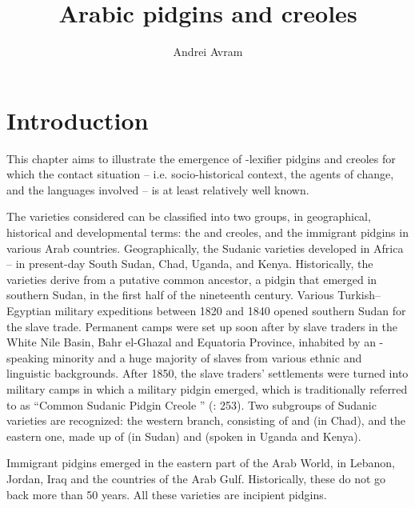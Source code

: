 \documentclass[output=paper]{langsci/langscibook}
\author{Andrei Avram\affiliation{University of Bucharest}}
\title{Arabic pidgins and creoles}
\begin{document}
\maketitle 


\section{Introduction}

This chapter aims to illustrate the emergence of -{lexifier} pidgins and creoles for which the contact situation – i.e. socio-historical context, the agents of change, and the languages involved – is at least relatively well known.

  The varieties considered can be classified into two groups, in geographical, historical and developmental terms: the  and creoles, and the immigrant pidgins in various Arab countries. Geographically, the {Sudanic} varieties developed in Africa – in present-day South Sudan, Chad, Uganda, and Kenya. Historically, the  varieties derive from a putative common ancestor, a {pidgin} that emerged in southern Sudan, in the first half of the nineteenth century. Various {Turkish}--Egyptian military expeditions between 1820 and 1840 opened southern Sudan for the slave trade. Permanent camps were set up soon after by slave traders in the White Nile Basin, Bahr el-Ghazal and Equatoria Province, inhabited by an -speaking minority and a huge majority of slaves from various ethnic and linguistic backgrounds. After 1850, the slave traders’ settlements were turned into military camps in which a military {pidgin} emerged, which is traditionally referred to as “Common {Sudanic} Pidgin Creole ” (\citealt{ToscoManfredi2013}: 253). Two subgroups of {Sudanic} varieties are recognized: the western branch, consisting of  and   (in Chad), and the eastern one, made up of   (in Sudan) and  (spoken in Uganda and Kenya). 

  Immigrant pidgins emerged in the eastern part of the Arab World, in Lebanon, Jordan, Iraq and the countries of the Arab Gulf. Historically, these do not go back more than 50 years. All these varieties are incipient pidgins.
\end{document}
